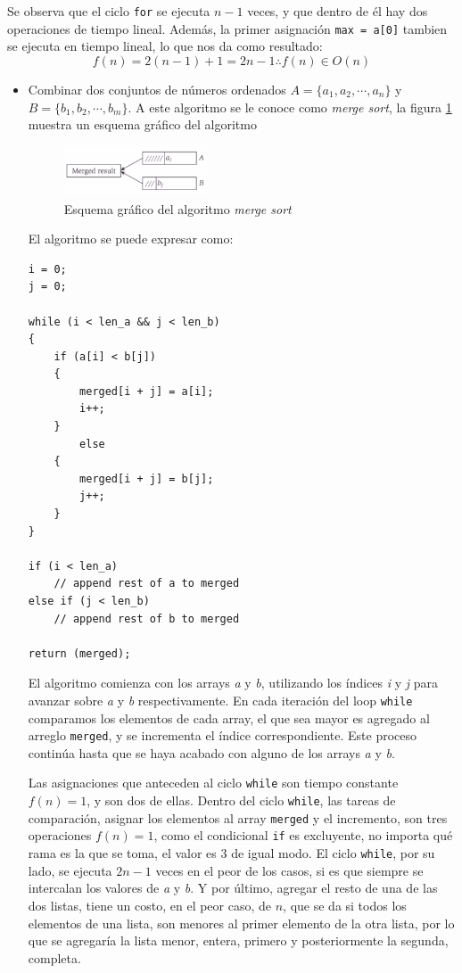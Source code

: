 \documentclass[letterpaper, 12pt]{article}
\begin{document}
Se observa que el ciclo \texttt{for} se ejecuta \(n-1\) veces, y que dentro de él hay dos
operaciones de tiempo lineal. Además, la primer asignación \texttt{max = a[0]} tambien
se ejecuta en tiempo lineal, lo que nos da como resultado:
$$
    f(n) = 2 \left(n -1\right) + 1 = 2n - 1 \therefore f(n) \in O(n)
    $$
\begin{itemize}
\item Combinar dos conjuntos de números ordenados \(A = \{a_1, a_2, \cdots, a_n\}\) y
\(B = \{b_1, b_2, \cdots, b_m\}\). A este algoritmo se le conoce como \emph{merge
sort}, la figura \ref{fig:merge_sort_lineal} muestra un esquema gráfico del algoritmo

\begin{figure}[htbp!]
\centering
\includegraphics[keepaspectratio,width=0.4\textwidth]{./img/merge_sort_lineal.png}
\caption{\label{fig:merge_sort_lineal}Esquema gráfico del algoritmo \emph{merge sort}}
\end{figure}

El algoritmo se puede expresar como:
\begin{verbatim}
i = 0;
j = 0;

while (i < len_a && j < len_b)
{
    if (a[i] < b[j])
    {
        merged[i + j] = a[i];
        i++;
    }
        else
    {
        merged[i + j] = b[j];
        j++;
    }
}

if (i < len_a)
    // append rest of a to merged
else if (j < len_b)
    // append rest of b to merged

return (merged);
\end{verbatim}

El algoritmo comienza con los arrays \emph{a} y \emph{b}, utilizando los índices \emph{i} y
\emph{j} para avanzar sobre \emph{a} y \emph{b} respectivamente. En cada iteración del loop
\texttt{while} comparamos los elementos de cada array, el que sea mayor es agregado
al arreglo \texttt{merged}, y se incrementa el índice correspondiente. Este proceso
continúa hasta que se haya acabado con alguno de los arrays \emph{a} y \emph{b}.

Las asignaciones que anteceden al ciclo \texttt{while} son tiempo constante
\(f(n) = 1\), y son dos de ellas. Dentro del ciclo \texttt{while}, las tareas de
comparación, asignar los elementos al array \texttt{merged} y el incremento, son
tres operaciones \(f(n) = 1\), como el condicional \texttt{if} es excluyente, no
importa qué rama es la que se toma, el valor es 3 de igual modo. El ciclo
\texttt{while}, por su lado, se ejecuta \(2n - 1\) veces en el peor de los casos,
si es que siempre se intercalan los valores de \emph{a} y \emph{b}. Y por último,
agregar el resto de una de las dos listas, tiene un costo, en el peor caso,
de \(n\), que se da si todos los elementos de una lista, son menores al
primer elemento de la otra lista, por lo que se agregaría la lista menor,
entera, primero y posteriormente la segunda, completa.


\end{itemize}
\end{document}
